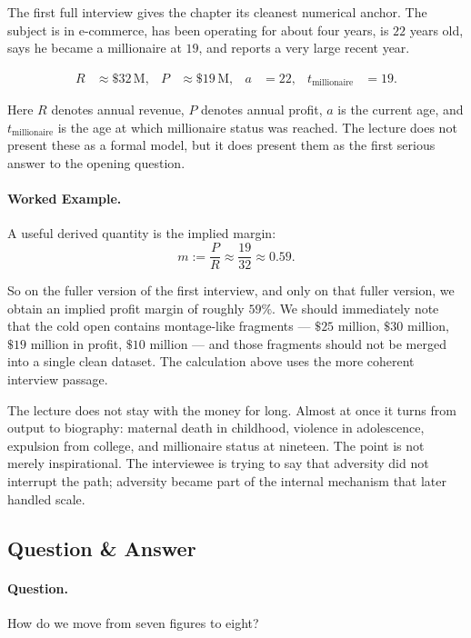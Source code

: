 The first full interview gives the chapter its cleanest numerical anchor. The subject is in e-commerce, has been operating for about four years, is $22$ years old, says he became a millionaire at $19$, and reports a very large recent year.

\begin{align}
R &\approx \$32\,\mathrm{M}, &
P &\approx \$19\,\mathrm{M}, &
a &= 22, &
t_{\text{millionaire}} &= 19.
\end{align}

Here \(R\) denotes annual revenue, \(P\) denotes annual profit, \(a\) is the current age, and \(t_{\text{millionaire}}\) is the age at which millionaire status was reached. The lecture does not present these as a formal model, but it does present them as the first serious answer to the opening question.

\paragraph{Worked Example.}
A useful derived quantity is the implied margin:
\begin{equation}
m := \frac{P}{R} \approx \frac{19}{32} \approx 0.59.
\end{equation}

So on the fuller version of the first interview, and only on that fuller version, we obtain an implied profit margin of roughly \(59\%\). We should immediately note that the cold open contains montage-like fragments --- \(\$25\) million, \(\$30\) million, \(\$19\) million in profit, \(\$10\) million --- and those fragments should not be merged into a single clean dataset. The calculation above uses the more coherent interview passage.

The lecture does not stay with the money for long. Almost at once it turns from output to biography: maternal death in childhood, violence in adolescence, expulsion from college, and millionaire status at nineteen. The point is not merely inspirational. The interviewee is trying to say that adversity did not interrupt the path; adversity became part of the internal mechanism that later handled scale.

\subsection{Question \& Answer}

\paragraph{Question.}
How do we move from seven figures to eight?

